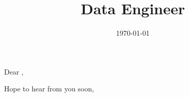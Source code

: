 \documentclass[11pt,a4paper,sans]{moderncv}
\title{Data Engineer}
\begin{document}
\clearpage

\recipient{}{\\} 
\date{\today} 
\opening{Dear ,} 
\closing{Hope to hear from you soon,} 

\makelettertitle 


\makeletterclosing
\end{document}

